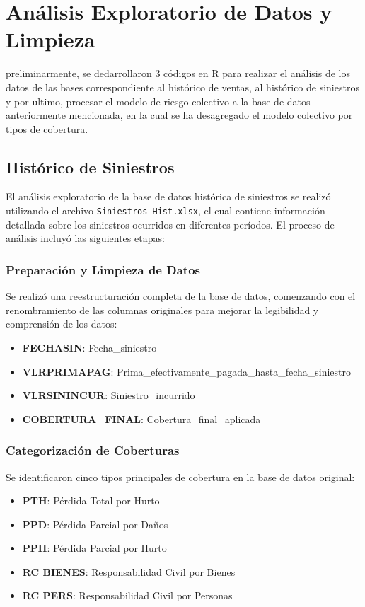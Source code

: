 \section{Análisis Exploratorio de Datos y Limpieza}

preliminarmente, se dedarrollaron 3 códigos en R para realizar el análisis de los datos de las bases correspondiente al histórico de ventas, al histórico de siniestros y por ultimo, procesar el modelo de riesgo colectivo a la base de datos anteriormente mencionada, en la cual se ha desagregado el modelo colectivo por tipos de cobertura.

\subsection{Histórico de Siniestros}

El análisis exploratorio de la base de datos histórica de siniestros se realizó utilizando el archivo \texttt{Siniestros\_Hist.xlsx}, el cual contiene información detallada sobre los siniestros ocurridos en diferentes períodos. El proceso de análisis incluyó las siguientes etapas:

\subsubsection{Preparación y Limpieza de Datos}

Se realizó una reestructuración completa de la base de datos, comenzando con el renombramiento de las columnas originales para mejorar la legibilidad y comprensión de los datos:

\begin{itemize}
    \item \textbf{FECHASIN}: Fecha\_siniestro
    \item \textbf{VLRPRIMAPAG}: Prima\_efectivamente\_pagada\_hasta\_fecha\_siniestro
    \item \textbf{VLRSININCUR}: Siniestro\_incurrido
    \item \textbf{COBERTURA\_FINAL}: Cobertura\_final\_aplicada
\end{itemize}

\subsubsection{Categorización de Coberturas}

Se identificaron cinco tipos principales de cobertura en la base de datos original:
\begin{itemize}
    \item \textbf{PTH}: Pérdida Total por Hurto
    \item \textbf{PPD}: Pérdida Parcial por Daños
    \item \textbf{PPH}: Pérdida Parcial por Hurto
    \item \textbf{RC BIENES}: Responsabilidad Civil por Bienes
    \item \textbf{RC PERS}: Responsabilidad Civil por Personas
\end{itemize}


